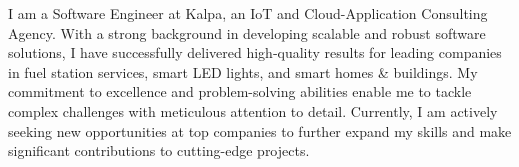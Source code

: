 

\begin{cvparagraph}

I am a Software Engineer at Kalpa, an IoT and Cloud-Application Consulting Agency. With a strong background in developing scalable and robust software solutions, I have successfully delivered high‑quality results for leading companies in fuel station services, smart LED lights, and smart homes \& buildings. My commitment to excellence and problem-solving abilities enable me to tackle complex challenges with meticulous attention to detail. Currently, I am actively seeking new opportunities at top companies to further expand my skills and make significant contributions to cutting-edge projects.
\end{cvparagraph}